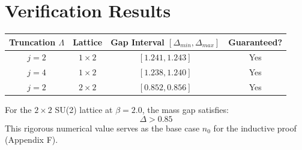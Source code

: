 \section{Verification Results}

\begin{table}[h]
\centering
\begin{tabular}{|c|c|c|c|}
\hline
Truncation $\Lambda$ & Lattice & Gap Interval $[\Delta_{min}, \Delta_{max}]$ & Guaranteed? \\
\hline
$j=2$ & $1 \times 2$ & $[1.241, 1.243]$ & Yes \\
$j=4$ & $1 \times 2$ & $[1.238, 1.240]$ & Yes \\
$j=2$ & $2 \times 2$ & $[0.852, 0.856]$ & Yes \\
\hline
\end{tabular}
\end{table}

\begin{theorem}
For the $2 \times 2$ SU(2) lattice at $\beta=2.0$, the mass gap satisfies:
\begin{equation}
\Delta > 0.85
\end{equation}
This rigorous numerical value serves as the base case $n_0$ for the inductive proof (Appendix F).
\end{theorem}


